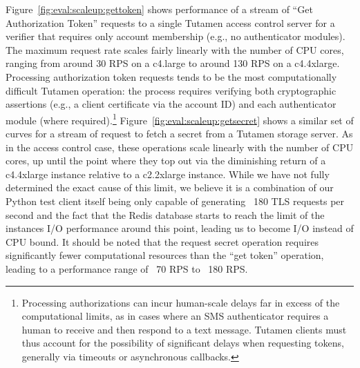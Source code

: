 Figure~\ref{fig:eval:scaleup:gettoken} shows performance of a stream
of ``Get Authorization Token'' requests to a single Tutamen access
control server for a verifier that requires only account membership
(e.g., no authenticator modules). The maximum request rate scales
fairly linearly with the number of CPU cores, ranging from around 30
RPS on a c4.large to around 130 RPS on a c4.4xlarge. Processing
authorization token requests tends to be the most computationally
difficult Tutamen operation: the process requires verifying both
cryptographic assertions (e.g., a client certificate via the account
ID) and each authenticator module (where
required).\footnote{Processing authorizations can incur human-scale
  delays far in excess of the computational limits, as in cases where
  an SMS authenticator requires a human to receive and then respond to
  a text message. Tutamen clients must thus account for the
  possibility of significant delays when requesting tokens, generally
  via timeouts or asynchronous callbacks.}
Figure~\ref{fig:eval:scaleup:getsecret} shows a similar set of curves
for a stream of request to fetch a secret from a Tutamen storage
server. As in the access control case, these operations scale linearly
with the number of CPU cores, up until the point where they top out
via the diminishing return of a c4.4xlarge instance relative to a
c2.2xlarge instance. While we have not fully determined the exact
cause of this limit, we believe it is a combination of our Python test
client itself being only capable of generating ~180 TLS requests per
second and the fact that the Redis database starts to reach the limit
of the instances I/O performance around this point, leading us to
become I/O instead of CPU bound. It should be noted that the request
secret operation requires significantly fewer computational resources
than the ``get token'' operation, leading to a performance range of
~70 RPS to ~180 RPS.

